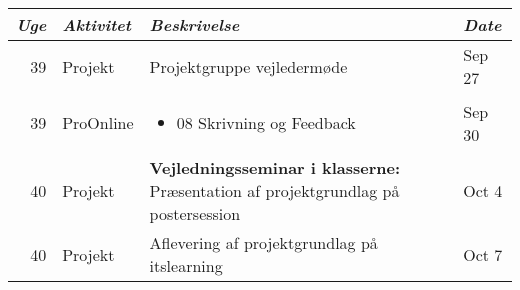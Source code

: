\begin{longtable}{|r|l|p{}|l|}
  \hline
  \emph{Uge} & \emph{Aktivitet} & \emph{Beskrivelse} & \emph{Date} \\
  \hline
  39 & Projekt & Projektgruppe vejledermøde & Sep 27 \\
  \hline
  39 & ProOnline & \begin{itemize}[noitemsep,leftmargin=*,topsep=0pt,partopsep=0pt]

  \item 08 Skrivning og Feedback

\end{itemize} & Sep 30 \\
  \hline
  40 & Projekt & \textbf{Vejledningsseminar i klasserne:} Præsentation af projektgrundlag på postersession & Oct 4 \\
  \hline
  40 & Projekt & Aflevering af projektgrundlag på itslearning & Oct 7 \\
  \hline
\end{longtable}
